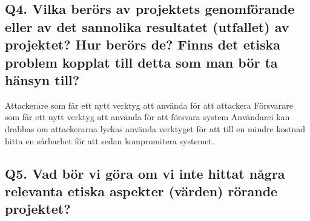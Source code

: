 \subsection{Q4. Vilka berörs av projektets genomförande eller av det sannolika resultatet (utfallet) av projektet? Hur berörs de? Finns det etiska problem kopplat till detta som man bör ta hänsyn till?}

Attackerare som får ett nytt verktyg att använda för att attackera
Försvarare som får ett nytt verktyg att använda för att försvara system
Användarei kan drabbas om attackerarna lyckas använda verktyget för att till en mindre kostnad hitta en sårbarhet för att sedan kompromitera systemet.

\subsection{Q5. Vad bör vi göra om vi inte hittat några relevanta etiska aspekter (värden) rörande projektet?}


